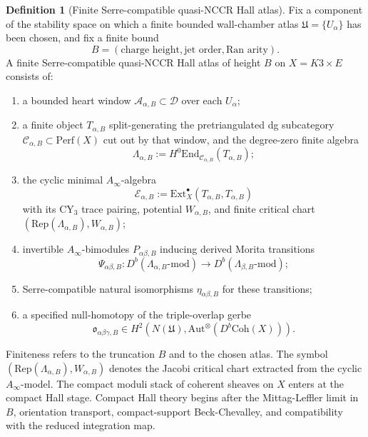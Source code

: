 \documentclass[11pt]{article}
\providecommand{\cC}{\mathcal{C}}
\providecommand{\cD}{\mathcal{D}}
\providecommand{\cE}{\mathcal{E}}
\providecommand{\Coh}{\mathrm{Coh}}
\providecommand{\End}{\mathrm{End}}
\providecommand{\Ext}{\mathrm{Ext}}
\providecommand{\Rep}{\mathrm{Rep}}
\providecommand{\NCCR}{\mathrm{NCCR}}
\providecommand{\Perf}{\mathrm{Perf}}
\theoremstyle{plain}
\theoremstyle{definition}
\newtheorem{definition}[theorem]{Definition}
\begin{document}
\begin{definition}[Finite Serre-compatible quasi-\(\NCCR\) Hall atlas]
Fix a component of the stability space on which a finite bounded
wall-chamber atlas \(\mathfrak U=\{U_\alpha\}\) has been chosen, and fix
a finite bound
\[
  B=(\text{charge height},\text{jet order},\text{Ran arity}).
\]
A finite Serre-compatible quasi-\(\NCCR\) Hall atlas of height \(B\) on
\(X=K3\times E\) consists of:
\begin{enumerate}
  \item a bounded heart window \(\mathcal A_{\alpha,B}\subset\cD\) over
  each \(U_\alpha\);
  \item a finite object \(T_{\alpha,B}\) split-generating the
  pretriangulated dg subcategory \(\cC_{\alpha,B}\subset\Perf(X)\)
  cut out by that window, and the degree-zero finite algebra
  \[
    \Lambda_{\alpha,B}:=
    H^0\End_{\cC_{\alpha,B}}(T_{\alpha,B});
  \]
  \item the cyclic minimal \(A_\infty\)-algebra
  \[
    \cE_{\alpha,B}:=\Ext_X^\bullet(T_{\alpha,B},T_{\alpha,B})
  \]
  with its CY\(_3\) trace pairing, potential \(W_{\alpha,B}\), and
  finite critical chart
  \((\Rep(\Lambda_{\alpha,B}),W_{\alpha,B})\);
  \item invertible \(A_\infty\)-bimodules \(P_{\alpha\beta,B}\)
  inducing derived Morita transitions
  \[
    \Psi_{\alpha\beta,B}\colon
    D^b(\Lambda_{\alpha,B}\text{-mod})
    \longrightarrow
    D^b(\Lambda_{\beta,B}\text{-mod});
  \]
  \item Serre-compatible natural isomorphisms
  \(\eta_{\alpha\beta,B}\) for these transitions;
  \item a specified null-homotopy of the triple-overlap gerbe
  \[
    \mathfrak o_{\alpha\beta\gamma,B}
    \in H^2\!\left(N(\mathfrak U),
    \mathrm{Aut}^{\otimes}(D^b\Coh(X))\right).
  \]
\end{enumerate}
Finiteness refers to the truncation \(B\) and to the chosen atlas.
The symbol \((\Rep(\Lambda_{\alpha,B}),W_{\alpha,B})\) denotes the
Jacobi critical chart extracted from the cyclic \(A_\infty\)-model.
The compact moduli stack of coherent sheaves on \(X\) enters at the
compact Hall stage.
Compact Hall theory begins after the Mittag-Leffler limit in \(B\),
orientation transport, compact-support Beck-Chevalley, and compatibility
with the reduced integration map.
\end{definition}
\end{document}
